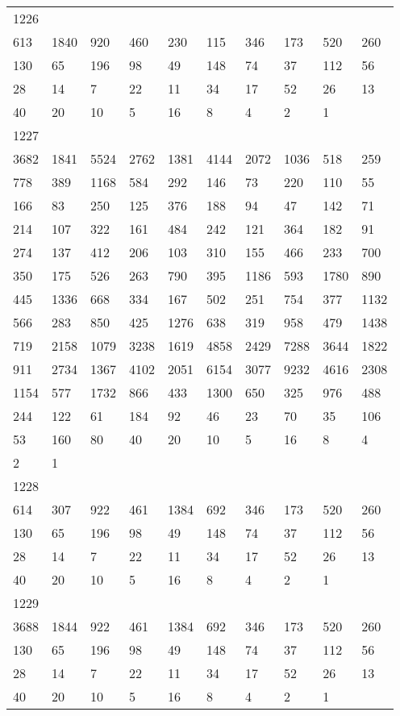 \begin{longtable}{*{10}{l}}
1226&&&&&&&&&\\
613& 1840& 920& 460& 230& 115& 346& 173& 520& 260\\
130& 65& 196& 98& 49& 148& 74& 37& 112& 56\\
28& 14& 7& 22& 11& 34& 17& 52& 26& 13\\
40& 20& 10& 5& 16& 8& 4& 2& 1& \\

1227&&&&&&&&&\\
3682& 1841& 5524& 2762& 1381& 4144& 2072& 1036& 518& 259\\
778& 389& 1168& 584& 292& 146& 73& 220& 110& 55\\
166& 83& 250& 125& 376& 188& 94& 47& 142& 71\\
214& 107& 322& 161& 484& 242& 121& 364& 182& 91\\
274& 137& 412& 206& 103& 310& 155& 466& 233& 700\\
350& 175& 526& 263& 790& 395& 1186& 593& 1780& 890\\
445& 1336& 668& 334& 167& 502& 251& 754& 377& 1132\\
566& 283& 850& 425& 1276& 638& 319& 958& 479& 1438\\
719& 2158& 1079& 3238& 1619& 4858& 2429& 7288& 3644& 1822\\
911& 2734& 1367& 4102& 2051& 6154& 3077& 9232& 4616& 2308\\
1154& 577& 1732& 866& 433& 1300& 650& 325& 976& 488\\
244& 122& 61& 184& 92& 46& 23& 70& 35& 106\\
53& 160& 80& 40& 20& 10& 5& 16& 8& 4\\
2& 1& \\

1228&&&&&&&&&\\
614& 307& 922& 461& 1384& 692& 346& 173& 520& 260\\
130& 65& 196& 98& 49& 148& 74& 37& 112& 56\\
28& 14& 7& 22& 11& 34& 17& 52& 26& 13\\
40& 20& 10& 5& 16& 8& 4& 2& 1& \\

1229&&&&&&&&&\\
3688& 1844& 922& 461& 1384& 692& 346& 173& 520& 260\\
130& 65& 196& 98& 49& 148& 74& 37& 112& 56\\
28& 14& 7& 22& 11& 34& 17& 52& 26& 13\\
40& 20& 10& 5& 16& 8& 4& 2& 1& \\


\end{longtable}
